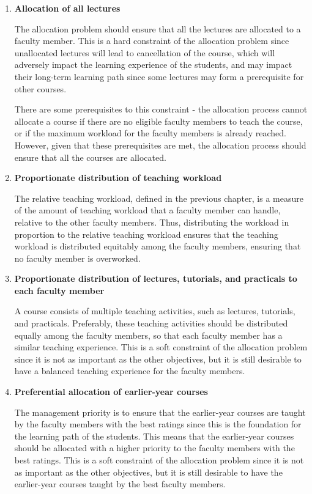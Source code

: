 \begin{enumerate}
  \item \textbf{Allocation of all lectures}

        The allocation problem should ensure that all the lectures are allocated to a faculty member. This is a hard constraint of the allocation problem since unallocated lectures will lead to cancellation of the course, which will adversely impact the learning experience of the students, and may impact their long-term learning path since some lectures may form a prerequisite for other courses.

        There are some prerequisites to this constraint - the allocation process cannot allocate a course if there are no eligible faculty members to teach the course, or if the maximum workload for the faculty members is already reached. However, given that these prerequisites are met, the allocation process should ensure that all the courses are allocated.

  \item \textbf{Proportionate distribution of teaching workload}

        The relative teaching workload, defined in the previous chapter, is a measure of the amount of teaching workload that a faculty member can handle, relative to the other faculty members. Thus, distributing the workload in proportion to the relative teaching workload ensures that the teaching workload is distributed equitably among the faculty members, ensuring that no faculty member is overworked.

  \item \textbf{Proportionate distribution of lectures, tutorials, and practicals to each faculty member}

        A course consists of multiple teaching activities, such as lectures, tutorials, and practicals. Preferably, these teaching activities should be distributed equally among the faculty members, so that each faculty member has a similar teaching experience. This is a soft constraint of the allocation problem since it is not as important as the other objectives, but it is still desirable to have a balanced teaching experience for the faculty members.

  \item \textbf{Preferential allocation of earlier-year courses}

        The management priority is to ensure that the earlier-year courses are taught by the faculty members with the best ratings since this is the foundation for the learning path of the students. This means that the earlier-year courses should be allocated with a higher priority to the faculty members with the best ratings. This is a soft constraint of the allocation problem since it is not as important as the other objectives, but it is still desirable to have the earlier-year courses taught by the best faculty members.


\end{enumerate}
